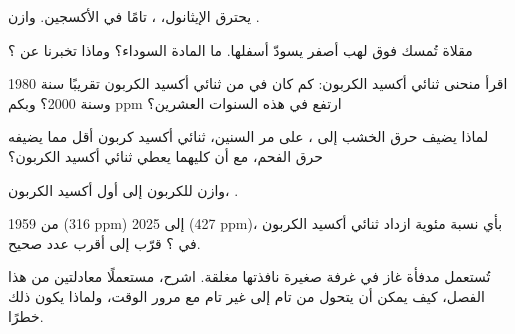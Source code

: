 \begin{exercise}[$\star\star$]\label{exo:g8:combustion-and-fuels:6}
يحترق الإيثانول، ،  تامًا في الأكسجين. وازن
. %
\end{exercise}

\begin{exercise}[$\star\star$]\label{exo:g8:combustion-and-fuels:7}
مقلاة تُمسك فوق لهب أصفر يسودّ أسفلها. ما المادة السوداء؟ وماذا تخبرنا
عن ؟
\end{exercise}

\begin{exercise}[$\star\star$]\label{exo:g8:combustion-and-fuels:8}
اقرأ منحنى ثنائي أكسيد الكربون: كم كان في  من ثنائي أكسيد الكربون
تقريبًا سنة 1980 وسنة 2000؟ وبكم ppm ارتفع في هذه السنوات
العشرين؟
\end{exercise}

\begin{exercise}[$\star\star$]\label{exo:g8:combustion-and-fuels:9}
لماذا يضيف حرق الخشب إلى ، على مر السنين، ثنائي أكسيد كربون أقل مما
يضيفه حرق الفحم، مع أن كليهما يعطي ثنائي أكسيد الكربون؟
\end{exercise}

\begin{exercise}[$\star\star$]\label{exo:g8:combustion-and-fuels:10}
وازن  للكربون إلى أول أكسيد الكربون،
. %
\end{exercise}

\begin{exercise}[$\star\star\star$]\label{exo:g8:combustion-and-fuels:11}
من 1959 (316 ppm) إلى 2025 (427 ppm)، بأي نسبة مئوية ازداد ثنائي أكسيد
الكربون في ؟ قرّب إلى أقرب عدد صحيح.
\end{exercise}

\begin{exercise}[$\star\star\star$]\label{exo:g8:combustion-and-fuels:12}
تُستعمل مدفأة غاز في غرفة صغيرة نافذتها مغلقة. اشرح، مستعملًا معادلتين من هذا
الفصل، كيف يمكن أن يتحول  من تام إلى غير تام مع مرور الوقت، ولماذا
يكون ذلك خطرًا.
\end{exercise}

